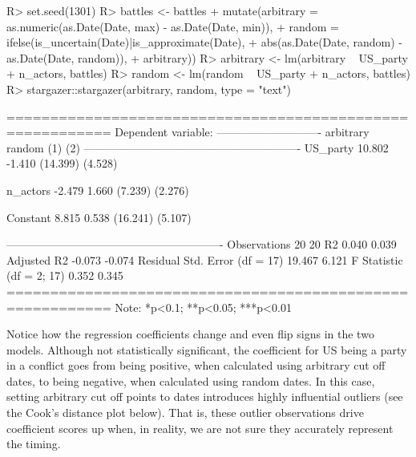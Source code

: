 \documentclass[
]{jss}
\begin{document}
\begin{CodeChunk}
\begin{CodeInput}
R> set.seed(1301)
R> battles <- battles %
+   mutate(arbitrary = as.numeric(as.Date(Date, max) - as.Date(Date, min)),
+          random = ifelse(is_uncertain(Date)|is_approximate(Date),
+                          abs(as.Date(Date, random) - as.Date(Date, random)),
+                          arbitrary))
R> arbitrary <- lm(arbitrary ~ US_party + n_actors, battles)
R> random <- lm(random ~ US_party + n_actors, battles)
R> stargazer::stargazer(arbitrary, random, type = "text")
\end{CodeInput}
\begin{CodeOutput}

==========================================================
                                  Dependent variable:     
                              ----------------------------
                                 arbitrary       random   
                                    (1)           (2)     
----------------------------------------------------------
US_party                          10.802         -1.410   
                                 (14.399)       (4.528)   
                                                          
n_actors                          -2.479         1.660    
                                  (7.239)       (2.276)   
                                                          
Constant                           8.815         0.538    
                                 (16.241)       (5.107)   
                                                          
----------------------------------------------------------
Observations                        20             20     
R2                                 0.040         0.039    
Adjusted R2                       -0.073         -0.074   
Residual Std. Error (df = 17)     19.467         6.121    
F Statistic (df = 2; 17)           0.352         0.345    
==========================================================
Note:                          *p<0.1; **p<0.05; ***p<0.01
\end{CodeOutput}
\end{CodeChunk}

Notice how the regression coefficients change and even flip signs in the
two models. Although not statistically significant, the coefficient for
US being a party in a conflict goes from being positive, when calculated
using arbitrary cut off dates, to being negative, when calculated using
random dates. In this case, setting arbitrary cut off points to dates
introduces highly influential outliers (see the Cook's distance plot
below). That is, these outlier observations drive coefficient scores up
when, in reality, we are not sure they accurately represent the timing.
\end{document}
